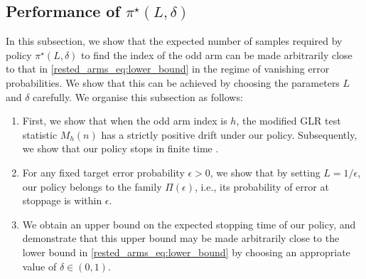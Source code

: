 \subsection{Performance of $\pi^\star(L,\delta)$}
In this subsection, we show that the expected number of samples required by policy $\pi^\star(L,\delta)$ to find the index of the odd arm can be made arbitrarily close to that in \eqref{rested_arms_eq:lower_bound} in the regime of vanishing error probabilities. We show that this can be achieved by choosing the parameters $L$ and $\delta$ carefully. We organise this subsection as follows:
\begin{enumerate}
	\item First, we show that when the odd arm index is $h$, the modified GLR test statistic $M_h(n)$ has a strictly positive drift under our policy. Subsequently, we show that our policy stops in finite time .
	\item For any fixed target error probability $\epsilon>0$, we show that by setting $L=1/\epsilon$, our policy belongs to the family $\Pi(\epsilon)$, i.e., its probability of error at stoppage is within $\epsilon$.
	\item We obtain an upper bound on the expected stopping time of our policy, and demonstrate that this upper bound may be made arbitrarily close to the lower bound in \eqref{rested_arms_eq:lower_bound} by choosing an appropriate value of $\delta\in (0,1)$.
\end{enumerate}

